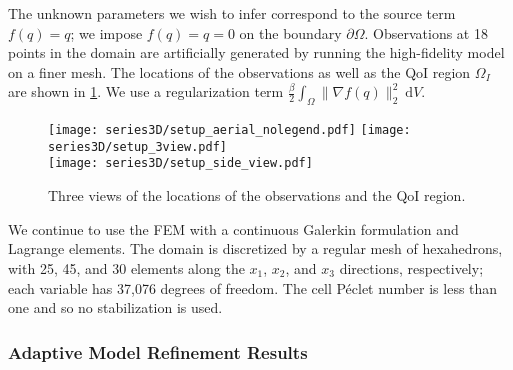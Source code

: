 The unknown parameters we wish to infer correspond to the source term $f(q)=q$; we impose $f(q)=q=0$ on the boundary $\partial\Omega$. Observations at 18 points in the domain are artificially generated by running the high-fidelity model on a finer mesh. The locations of the observations as well as the QoI region $\Omega_I$ are shown in \cref{fig:setup3D}. We use a regularization term $\frac{\beta}{2}\int_\Omega \|\nabla f(q)\|_2^2\:\textrm{d}V$.
%
\begin{figure}[htbp]
\centering
\texttt{[image: series3D/setup\_aerial\_nolegend.pdf]} \hfill
\texttt{[image: series3D/setup\_3view.pdf]} \\ 
\vspace{\baselineskip}
\texttt{[image: series3D/setup\_side\_view.pdf]}
\caption{Three views of the locations of the observations and the QoI region.}
\label{fig:setup3D}
\end{figure}
%
We continue to use the FEM with a continuous Galerkin formulation and Lagrange elements. The domain is discretized by a regular mesh of hexahedrons, with 25, 45, and 30 elements along the $x_1$, $x_2$, and $x_3$ directions, respectively; each variable has 37,076 degrees of freedom. The cell P\'{e}clet number is less than one and so no stabilization is used.

\subsubsection{Adaptive Model Refinement Results} \label{sec:ref3D}


